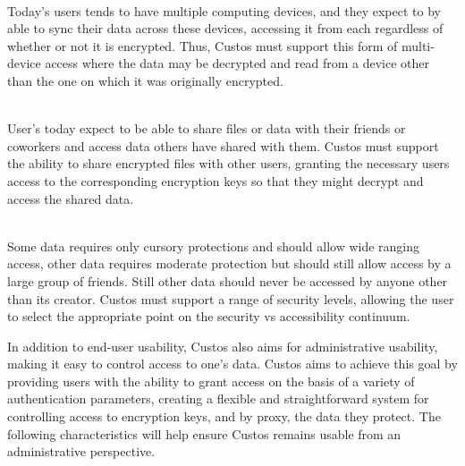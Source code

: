 \begin{packed_desc}
\item[Multi-Device Support] \hfill \\ Today's users tends to have
  multiple computing devices, and they expect to by able to sync their
  data across these devices, accessing it from each regardless of
  whether or not it is encrypted. Thus, Custos must support this form
  of multi-device access where the data may be decrypted and read from
  a device other than the one on which it was originally encrypted.
\item[Multi-User Support] \hfill \\ User's today expect to be able to
  share files or data with their friends or coworkers and access data
  others have shared with them. Custos must support the ability to
  share encrypted files with other users, granting the necessary users
  access to the corresponding encryption keys so that they might
  decrypt and access the shared data.
\item[Flexible Protection Semantics] \hfill \\ Some data requires only
  cursory protections and should allow wide ranging access, other data
  requires moderate protection but should still allow access by a
  large group of friends. Still other data should never be accessed by
  anyone other than its creator. Custos must support a range of
  security levels, allowing the user to select the appropriate point
  on the security vs accessibility continuum.
\end{packed_desc}

In addition to end-user usability, Custos also aims for administrative
usability, making it easy to control access to one's data. Custos aims
to achieve this goal by providing users with the ability to grant
access on the basis of a variety of authentication parameters,
creating a flexible and straightforward system for controlling access
to encryption keys, and by proxy, the data they protect. The following
characteristics will help ensure Custos remains usable from an
administrative perspective.

